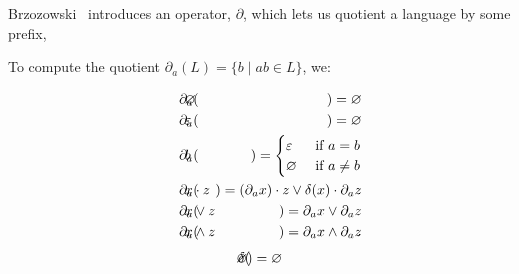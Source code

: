\documentclass[sigplan,review,acmsmall,nonacm,screen,anonymous]{acmart}\settopmatter{printfolios=false,printccs=false,printacmref=false}
\begin{document}
\noindent Brzozowski~\cite{brzozowski1964derivatives} introduces an operator, $\partial$, which lets us quotient a language by some prefix,

\begin{definition}[Brzozowski, 1964]
  To compute the quotient \(\partial_a(L) = \{b \mid ab \in L\}\), we:

  \vspace{-0.8cm}
  \begin{multicols}{2}
    \begin{eqnarray*}
      \phantom{--}\partial_a(&\hspace{-0.35cm} \varnothing \hspace{-0.35cm}&) = \varnothing                                           \\
      \phantom{--}\partial_a(&\hspace{-0.35cm} \varepsilon \hspace{-0.35cm}&) = \varnothing                                           \\
      \phantom{--}\partial_a(&\hspace{-0.35cm} b           \hspace{-0.35cm}&) = \begin{cases}\varepsilon &\text{ if } a = b\\ \varnothing &\text{ if } a \neq b \end{cases}\\
      \phantom{--}\partial_a(&\hspace{-0.35cm} x\cdot z    \hspace{-0.35cm}&) = (\partial_a x)\cdot z \vee \delta(x)\cdot\partial_a z \\
      \phantom{--}\partial_a(&\hspace{-0.35cm} x\vee  z    \hspace{-0.35cm}&) =  \partial_a x \vee  \partial_a z                       \\
      \phantom{--}\partial_a(&\hspace{-0.35cm} x\land z    \hspace{-0.35cm}&) =  \partial_a x \land \partial_a z
    \end{eqnarray*} \break\vspace{-0.45cm}
    \begin{eqnarray*}
      \delta(&\hspace{-0.35cm} \varnothing \hspace{-0.35cm}&) = \varnothing                                      \\

\end{eqnarray*}
\end{multicols}
\end{definition}
\end{document}
